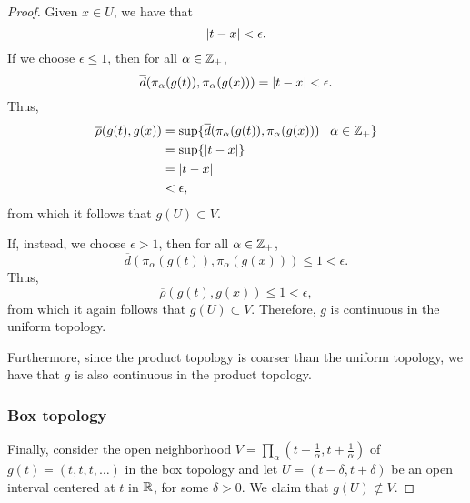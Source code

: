 \begin{solution}
\begin{proof}
        Given $x \in U$, we have that
        \begin{equation*}
          \left| t - x \right| < \epsilon.
        \end{equation*}
        If we choose $\epsilon \leq 1$, then for all $\alpha \in \mathbb{Z}_+$,
        \begin{equation*}
        \overline{d}(\pi_\alpha(g(t)), \pi_\alpha(g(x))) = \left| t - x \right| < \epsilon.
        \end{equation*}
        Thus,
        \begin{align*}
          \overline{\rho}(g(t), g(x)) &= \sup\{\overline{d}(\pi_\alpha(g(t)), \pi_\alpha(g(x))) \mid \alpha \in \mathbb{Z}_+\} \\
                                      &= \sup\{\left| t - x \right|\} \\
                                      &= \left| t - x \right| \\
                                      &< \epsilon,
        \end{align*}
        from which it follows that $g(U) \subset V$.

        If, instead, we choose $\epsilon > 1$, then for all $\alpha \in \mathbb{Z}_+$,
        \begin{equation*}
          \overline{d}(\pi_\alpha(g(t)), \pi_\alpha(g(x))) \leq 1 < \epsilon.
        \end{equation*}
        Thus,
        \begin{equation*}
          \overline{\rho}(g(t), g(x)) \leq 1 < \epsilon,
        \end{equation*}
        from which it again follows that $g(U) \subset V$.
        Therefore, $g$ is continuous in the uniform topology.

        Furthermore, since the product topology is coarser than the uniform topology, we have that $g$ is also continuous in the product topology.

        \subsubsection*{Box topology}
        Finally, consider the open neighborhood $V = \prod_\alpha (t - \tfrac{1}{\alpha}, t + \tfrac{1}{\alpha})$ of $g(t) = (t, t, t, \ldots)$ in the box topology and let $U = (t - \delta, t + \delta)$ be an open interval centered at $t$ in $\mathbb{R}$, for some $\delta > 0$.
        We claim that $g(U) \not\subset V$.


\end{proof}
\end{solution}
